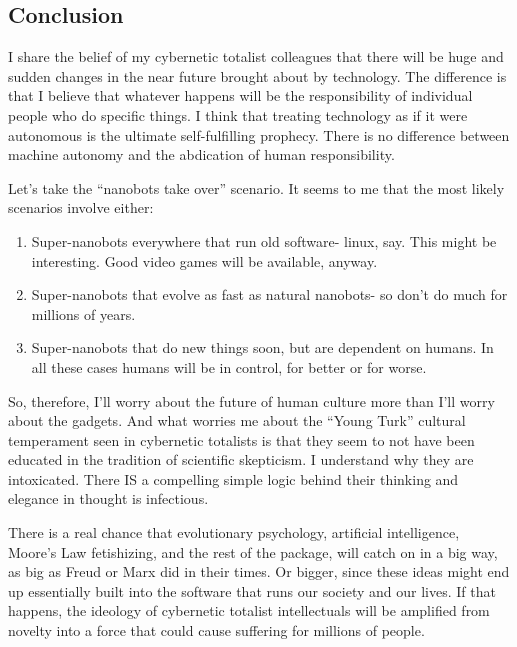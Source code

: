 \documentclass[letterpaper,12pt,english]{sphinxmanual}
\begin{document}
\subsection{Conclusion}
\label{lanier:conclusion}
I share the belief of my cybernetic totalist colleagues that there will be huge and sudden changes in the near future brought about by technology. The difference is that I believe that whatever happens will be the responsibility of individual people who do specific things. I think that treating technology as if it were autonomous is the ultimate self-fulfilling prophecy. There is no difference between machine autonomy and the abdication of human responsibility.

Let's take the ``nanobots take over'' scenario. It seems to me that the most likely scenarios involve either:
\begin{enumerate}
\item {} 
Super-nanobots everywhere that run old software- linux, say. This might be interesting. Good video games will be available, anyway.

\item {} 
Super-nanobots that evolve as fast as natural nanobots- so don't do much for millions of years.

\item {} 
Super-nanobots that do new things soon, but are dependent on humans. In all these cases humans will be in control, for better or for worse.

\end{enumerate}

So, therefore, I'll worry about the future of human culture more than I'll worry about the gadgets. And what worries me about the ``Young Turk'' cultural temperament seen in cybernetic totalists is that they seem to not have been educated in the tradition of scientific skepticism. I understand why they are intoxicated. There IS a compelling simple logic behind their thinking and elegance in thought is infectious.

There is a real chance that evolutionary psychology, artificial intelligence, Moore's Law fetishizing, and the rest of the package, will catch on in a big way, as big as Freud or Marx did in their times. Or bigger, since these ideas might end up essentially built into the software that runs our society and our lives. If that happens, the ideology of cybernetic totalist intellectuals will be amplified from novelty into a force that could cause suffering for millions of people.
\end{document}

